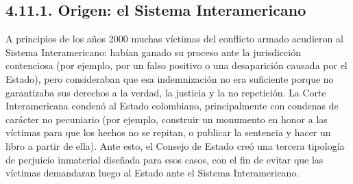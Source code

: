\subsection{4.11.1. Origen: el Sistema Interamericano}
A principios de los años 2000 muchas víctimas del conflicto armado acudieron al Sistema Interamericano: habían ganado su proceso ante la jurisdicción contenciosa (por ejemplo, por un falso positivo o una desaparición causada por el Estado), pero consideraban que esa indemnización no era suficiente porque no garantizaba sus derechos a la verdad, la justicia y la no repetición. La Corte Interamericana condenó al Estado colombiano, principalmente con condenas de carácter no pecuniario (por ejemplo, construir un monumento en honor a las víctimas para que los hechos no se repitan, o publicar la sentencia y hacer un libro a partir de ella). Ante esto, el Consejo de Estado creó una tercera tipología de perjuicio inmaterial diseñada para esos casos, con el fin de evitar que las víctimas demandaran luego al Estado ante el Sistema Interamericano.


